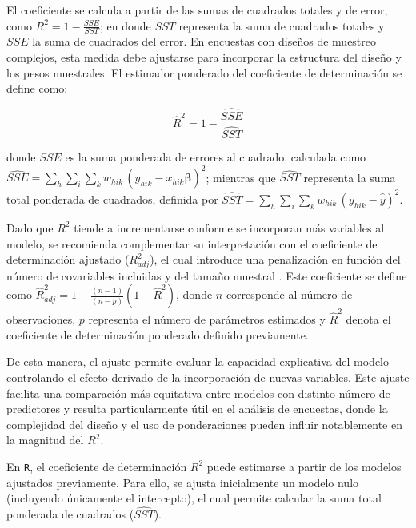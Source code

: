 \documentclass[
  spanish,
  12pt,
]{book}
\begin{document}
El coeficiente se calcula a partir de las sumas de cuadrados totales y de error, como \(R^{2} = 1 - \frac{SSE}{SST}\); en donde \(SST\) representa la suma de cuadrados totales y \(SSE\) la suma de cuadrados del error. En encuestas con diseños de muestreo complejos, esta medida debe ajustarse para incorporar la estructura del diseño y los pesos muestrales. El estimador ponderado del coeficiente de determinación se define como:

\[
\hat{R}^2 = 1 - \frac{\widehat{SSE}}{\widehat{SST}}
\]

donde \(\widehat{SSE}\) es la suma ponderada de errores al cuadrado, calculada como \(\widehat{SSE} = \sum_{h} \sum_{i} \sum_{k} w_{hik} \,(y_{hik} - x_{hik}\hat{\boldsymbol{\beta}})^2\); mientras que \(\widehat{SST}\) representa la suma total ponderada de cuadrados, definida por \(\widehat{SST} = \sum_{h} \sum_{i} \sum_{k} w_{hik}\,(y_{hik} - \hat{\bar{y}})^2\).

Dado que \(R^{2}\) tiende a incrementarse conforme se incorporan más variables al modelo, se recomienda complementar su interpretación con el coeficiente de determinación ajustado (\(R_{adj}^{2}\)), el cual introduce una penalización en función del número de covariables incluidas y del tamaño muestral \citep{pfeffermann2011modelling}. Este coeficiente se define como \(\hat{R}^2_{adj} = 1 - \frac{(n-1)}{(n-p)}(1 - \hat{R}^2)\), donde \(n\) corresponde al número de observaciones, \(p\) representa el número de parámetros estimados y \(\hat{R}^{2}\) denota el coeficiente de determinación ponderado definido previamente.

De esta manera, el ajuste permite evaluar la capacidad explicativa del modelo controlando el efecto derivado de la incorporación de nuevas variables. Este ajuste facilita una comparación más equitativa entre modelos con distinto número de predictores y resulta particularmente útil en el análisis de encuestas, donde la complejidad del diseño y el uso de ponderaciones pueden influir notablemente en la magnitud del \(R^{2}\).

En \texttt{R}, el coeficiente de determinación \(R^{2}\) puede estimarse a partir de los modelos ajustados previamente. Para ello, se ajusta inicialmente un modelo nulo (incluyendo únicamente el intercepto), el cual permite calcular la suma total ponderada de cuadrados (\(\widehat{SST}\)).
\end{document}
